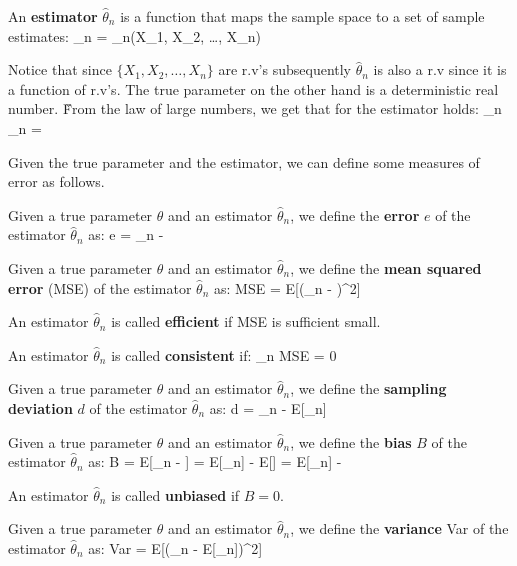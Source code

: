 \bd[Estimator]
An \textbf{estimator} $\hat{\theta}_{n}$ is a function that maps the sample space to a set of sample estimates:
\bse
\hat{\theta}_{n} = \hat{\theta}_{n}(X_{1}, X_{2}, \ldots, X_{n})
\ese
\ed

Notice that since $\{ X_{1}, X_{2}, \ldots, X_{n} \}$ are r.v's subsequently $\hat{\theta}_{n}$ is also a r.v since
it is a function of r.v's. The true parameter on the other hand is a deterministic real number. \v

From the law of large numbers, we get that for the estimator holds:
\bse
\lim_{n\to\infty} \hat{\theta}_{n} = \theta
\ese

Given the true parameter and the estimator, we can define some measures of error as follows.

\bd[Error]
Given a true parameter $\theta$ and an estimator $\hat{\theta}_{n}$, we define the \textbf{error} $e$ of the estimator
$\hat{\theta}_{n}$ as:
\bse
e = \hat{\theta}_{n} - \theta
\ese
\ed

Given a true parameter $\theta$ and an estimator $\hat{\theta}_{n}$, we define the \textbf{mean squared error} (MSE)
of the estimator $\hat{\theta}_{n}$ as:
\bse
MSE = E[(\hat{\theta}_{n} - \theta)^2]
\ese
\ed

An estimator $\hat{\theta}_{n}$ is called \textbf{efficient} if MSE is sufficient small.
\ed

An estimator $\hat{\theta}_{n}$ is called \textbf{consistent} if:
\bse
\lim_{n \to \infty} MSE = 0
\ese
\ed

Given a true parameter $\theta$ and an estimator $\hat{\theta}_{n}$, we define the \textbf{sampling deviation} $d$ of the
estimator $\hat{\theta}_{n}$ as:
\bse
d = \hat{\theta}_{n} - E[\hat{\theta}_{n}]
\ese
\ed

\bd[Bias]
Given a true parameter $\theta$ and an estimator $\hat{\theta}_{n}$, we define the \textbf{bias} $B$ of the estimator
$\hat{\theta}_{n}$ as:
\bse
B = E[\hat{\theta}_{n} - \theta] = E[\hat{\theta}_{n}] - E[\theta] = E[\hat{\theta}_{n}] - \theta
\ese
\ed

An estimator $\hat{\theta}_{n}$ is called \textbf{unbiased} if $B=0$.
\ed

\bd[Variance]
Given a true parameter $\theta$ and an estimator $\hat{\theta}_{n}$, we define the \textbf{variance} Var of the estimator
$\hat{\theta}_{n}$ as:
\bse
Var = E[(\hat{\theta}_{n} - E[\hat{\theta}_{n}])^2]
\ese
\ed

